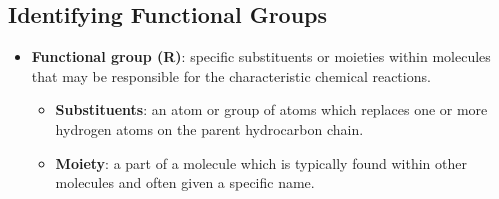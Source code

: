\documentclass[12pt,a4paper]{article}
\begin{document}
\subsection{Identifying Functional Groups}
\begin{itemize}
    \item \textbf{Functional group (R)}: specific substituents or moieties within molecules that may be responsible for the characteristic chemical reactions.
        \begin{itemize}
            \item \textbf{Substituents}: an atom or group of atoms which replaces one or more hydrogen atoms on the parent hydrocarbon chain.
            \item \textbf{Moiety}: a part of a molecule which is typically found within other molecules and often given a specific name.
        \end{itemize}

\end{itemize}
\end{document}

